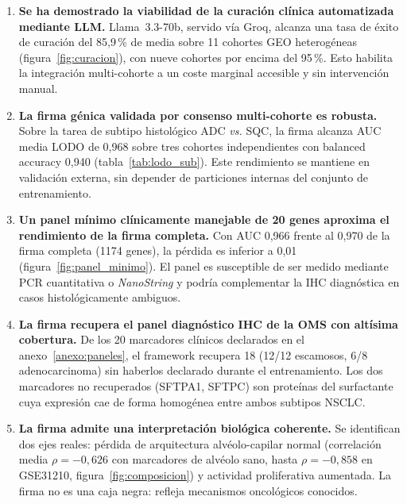 \begin{enumerate}
  \item \textbf{Se ha demostrado la viabilidad de la curación clínica
  automatizada mediante LLM.} Llama~3.3-70b, servido vía Groq, alcanza
  una tasa de éxito de curación del 85,9\,\% de media sobre 11 cohortes
  GEO heterogéneas (figura~\ref{fig:curacion}), con nueve cohortes por
  encima del 95\,\%. Esto habilita la integración multi-cohorte a un
  coste marginal accesible y sin intervención manual.

  \item \textbf{La firma génica validada por consenso multi-cohorte es
  robusta.} Sobre la tarea de subtipo histológico ADC \emph{vs.} SQC, la
  firma alcanza AUC media LODO de 0,968 sobre tres cohortes
  independientes con balanced accuracy 0,940 (tabla~\ref{tab:lodo_sub}).
  Este rendimiento se mantiene en validación externa, sin depender de
  particiones internas del conjunto de entrenamiento.

  \item \textbf{Un panel mínimo clínicamente manejable de 20 genes
  aproxima el rendimiento de la firma completa.} Con AUC 0,966 frente al
  0,970 de la firma completa (1174 genes), la pérdida es inferior a
  0,01 (figura~\ref{fig:panel_minimo}). El panel es susceptible de ser
  medido mediante PCR cuantitativa o \emph{NanoString} y podría
  complementar la IHC diagnóstica en casos histológicamente ambiguos.

  \item \textbf{La firma recupera el panel diagnóstico IHC de la OMS
  con altísima cobertura.} De los 20 marcadores clínicos declarados en
  el anexo~\ref{anexo:paneles}, el framework recupera 18 (12/12
  escamosos, 6/8 adenocarcinoma) sin haberlos declarado durante el
  entrenamiento. Los dos marcadores no recuperados (SFTPA1, SFTPC) son
  proteínas del surfactante cuya expresión cae de forma homogénea entre
  ambos subtipos NSCLC.

  \item \textbf{La firma admite una interpretación biológica coherente.}
  Se identifican dos ejes reales: pérdida de arquitectura alvéolo-capilar
  normal (correlación media $\rho=-0{,}626$ con marcadores de alvéolo
  sano, hasta $\rho=-0{,}858$ en GSE31210, figura~\ref{fig:composicion})
  y actividad proliferativa aumentada. La firma no es una caja negra:
  refleja mecanismos oncológicos conocidos.


\end{enumerate}
